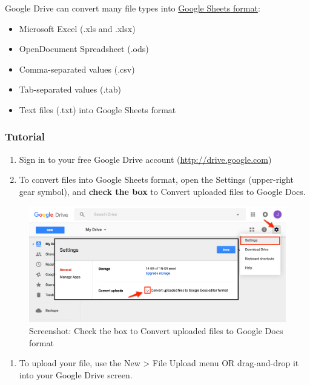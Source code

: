 \documentclass[
  english,
]{book}
\providecommand{\tightlist}{%
  \setlength{\itemsep}{0pt}\setlength{\parskip}{0pt}}
\begin{document}
Google Drive can convert many file types into \href{https://www.google.com/sheets/about/}{Google Sheets format}:

\begin{itemize}
\tightlist
\item
  Microsoft Excel (.xls and .xlsx)
\item
  OpenDocument Spreadsheet (.ods)
\item
  Comma-separated values (.csv)
\item
  Tab-separated values (.tab)
\item
  Text files (.txt) into Google Sheets format
\end{itemize}

\hypertarget{tutorial}{%
\subsubsection*{Tutorial}\label{tutorial}}

\begin{enumerate}
\def\labelenumi{\arabic{enumi})}
\item
  Sign in to your free Google Drive account (\url{http://drive.google.com})
\item
  To convert files into Google Sheets format, open the Settings (upper-right gear symbol), and \textbf{check the box} to Convert uploaded files to Google Docs.
\end{enumerate}

\begin{figure}
\centering
\includegraphics{images/02-spreadsheet/google-drive-settings-convert-uploads.png}
\caption{Screenshot: Check the box to Convert uploaded files to Google Docs format}
\end{figure}

\begin{enumerate}
\def\labelenumi{\arabic{enumi})}
\setcounter{enumi}{2}
\tightlist
\item
  To upload your file, use the New \textgreater{} File Upload menu OR drag-and-drop it into your Google Drive screen.
\end{enumerate}
\end{document}
